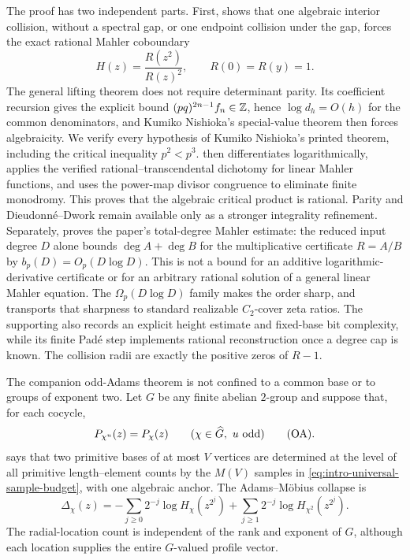 The proof has two independent parts.  First,
 shows that one algebraic interior
collision, without a spectral gap, or one endpoint collision under the gap,
forces the exact rational Mahler coboundary
\[
 H(z)=\frac{R(z^2)}{R(z)^2},\qquad R(0)=R(y)=1.
\]
The general lifting theorem does not require determinant parity.  Its
coefficient recursion gives the explicit bound
\((pq)^{2n-1}f_n\in\mathbb{Z}\), hence \(\log d_h=O(h)\) for the common
denominators, and Kumiko Nishioka's special-value theorem then forces
algebraicity.  We verify every hypothesis of Kumiko Nishioka's printed
theorem, including the critical inequality \(p^2<p^3\).
 then differentiates logarithmically,
applies the verified rational--transcendental dichotomy for linear Mahler
functions, and uses the power-map divisor congruence to eliminate finite
monodromy.  This proves that the algebraic critical product is rational.
Parity and Dieudonn\'e--Dwork remain available only as a stronger integrality
refinement.
Separately,
 proves the paper's
total-degree Mahler estimate: the reduced input degree \(D\) alone bounds
\(\deg A+\deg B\) for the multiplicative certificate \(R=A/B\) by
\(b_p(D)=O_p(D\log D)\).  This is not a bound for an additive
logarithmic-derivative certificate or for an arbitrary rational solution of a
general linear Mahler equation.  The \(\Omega_p(D\log D)\) family makes the
order sharp, and 
transports that sharpness to standard realizable \(C_2\)-cover zeta ratios.
The supporting  also records
an explicit height estimate and fixed-base bit complexity, while its finite
Pad\'e step implements rational reconstruction once a degree cap is known.
The collision radii are exactly the positive zeros of \(R-1\).

The companion odd-Adams theorem is not confined to a common base or to
groups of exponent two.  Let \(G\) be any finite abelian \(2\)-group and
suppose
that, for each cocycle,
\[
 P_{\chi^u}(z)=P_\chi(z)
 \qquad(\chi\in\widehat G,\ u\ {\rm odd})\qquad\text{\rm(OA)}.
\]
 says that two primitive
bases of at most \(V\) vertices are determined at the level of all primitive
length--element counts by the \(M(V)\) samples in
\eqref{eq:intro-universal-sample-budget}, with one algebraic anchor.  The
Adams--M\"obius collapse is
\[
 \Delta_\chi(z)
 =-\sum_{j\ge0}2^{-j}\log H_\chi(z^{2^j})
  +\sum_{j\ge1}2^{-j}\log H_{\chi^2}(z^{2^j}).
\]
The radial-location count is independent of the rank and exponent of \(G\),
although each location supplies the entire \(G\)-valued profile vector.

